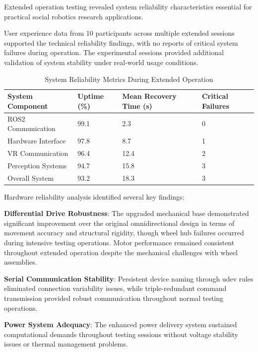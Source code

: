 Extended operation testing revealed system reliability characteristics essential for practical social robotics research applications.

User experience data from 10 participants across multiple extended sessions supported the technical reliability findings, with no reports of critical system failures during operation. The experimental sessions provided additional validation of system stability under real-world usage conditions.

\begin{table}[H]
    \centering
    \footnotesize
    \begin{tabular}{|p{3cm}|p{2.5cm}|p{2.5cm}|p{2.5cm}|}
        \hline
        \textbf{System Component} & \textbf{Uptime (\%)} & \textbf{Mean Recovery Time (s)} & \textbf{Critical Failures} \\
        \hline
        ROS2 Communication & 99.1 & 2.3 & 0 \\
        Hardware Interface & 97.8 & 8.7 & 1 \\
        VR Communication & 96.4 & 12.4 & 2 \\
        Perception Systems & 94.7 & 15.8 & 3 \\
        Overall System & 93.2 & 18.3 & 3 \\
        \hline
    \end{tabular}
    \caption{System Reliability Metrics During Extended Operation}
    \label{tab:system_reliability}
\end{table}

Hardware reliability analysis identified several key findings:

\textbf{Differential Drive Robustness}: The upgraded mechanical base demonstrated significant improvement over the original omnidirectional design in terms of movement accuracy and structural rigidity, though wheel hub failures occurred during intensive testing operations. Motor performance remained consistent throughout extended operation despite the mechanical challenges with wheel assemblies.

\textbf{Serial Communication Stability}: Persistent device naming through udev rules eliminated connection variability issues, while triple-redundant command transmission provided robust communication throughout normal testing operations.

\textbf{Power System Adequacy}: The enhanced power delivery system sustained computational demands throughout testing sessions without voltage stability issues or thermal management problems.

